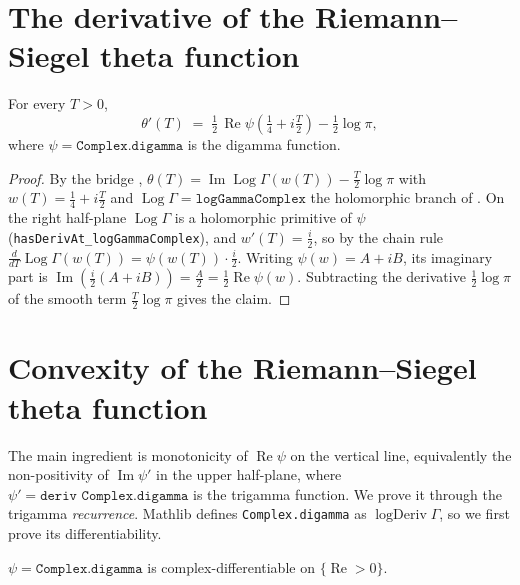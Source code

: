 \section{The derivative of the Riemann--Siegel theta function}
\label{sec:ga_deriv}

\begin{lemma}
\label{lem:ga_theta_deriv}
\leanok
{}
For every $T>0$,
\[
  \theta'(T)\;=\;\tfrac12\,\operatorname{Re}\psi\!\left(\tfrac14+i\tfrac T2\right)-\tfrac12\log\pi,
\]
where $\psi=\texttt{Complex.digamma}$ is the digamma function.
\end{lemma}

\begin{proof}
\leanok
{}
By the bridge ,
$\theta(T)=\operatorname{Im}\operatorname{Log}\Gamma(w(T))-\tfrac T2\log\pi$ with
$w(T)=\tfrac14+i\tfrac T2$ and $\operatorname{Log}\Gamma=\texttt{logGammaComplex}$
the holomorphic branch of . On the right half-plane
$\operatorname{Log}\Gamma$ is a holomorphic primitive of $\psi$
(\texttt{hasDerivAt\_logGammaComplex}), and $w'(T)=\tfrac i2$, so by the chain rule
$\tfrac{d}{dT}\operatorname{Log}\Gamma(w(T))=\psi(w(T))\cdot\tfrac i2$. Writing
$\psi(w)=A+iB$, its imaginary part is $\operatorname{Im}(\tfrac i2(A+iB))=\tfrac A2
=\tfrac12\operatorname{Re}\psi(w)$. Subtracting the derivative $\tfrac12\log\pi$ of
the smooth term $\tfrac T2\log\pi$ gives the claim.
\end{proof}

\section{Convexity of the Riemann--Siegel theta function}
\label{sec:ga_convex}

The main ingredient is monotonicity of $\operatorname{Re}\psi$ on the vertical
line, equivalently the non-positivity of $\operatorname{Im}\psi'$ in the upper
half-plane, where $\psi'=\texttt{deriv Complex.digamma}$ is the trigamma function. We
prove it through the trigamma \emph{recurrence}. Mathlib defines \texttt{Complex.digamma}
as $\operatorname{logDeriv}\Gamma$, so we first prove its differentiability.

\begin{lemma}
\label{lem:ga_digamma_diff}
\leanok
$\psi=\texttt{Complex.digamma}$ is complex-differentiable on $\{\operatorname{Re}>0\}$.
\end{lemma}

